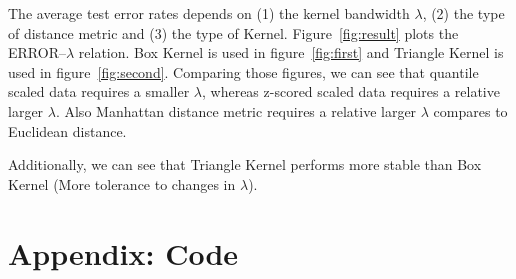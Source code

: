 \documentclass[12pt]{article}
\begin{document}
The average test error rates depends on (1) the kernel bandwidth $\lambda$, (2) the type of distance metric and (3) the type of Kernel. Figure~\ref{fig:result} plots the ERROR--$\lambda$ relation. Box Kernel is used in figure~\ref{fig:first} and Triangle Kernel is used in figure~\ref{fig:second}. Comparing those figures, we can see that quantile scaled data requires a smaller $\lambda$, whereas z-scored scaled data requires a relative larger $\lambda$. Also Manhattan distance metric requires a relative larger $\lambda$ compares to Euclidean distance.

Additionally, we can see that Triangle Kernel performs more stable than Box Kernel (More tolerance to changes in $\lambda$).

\newpage
\section{Appendix: Code}
\end{document}
